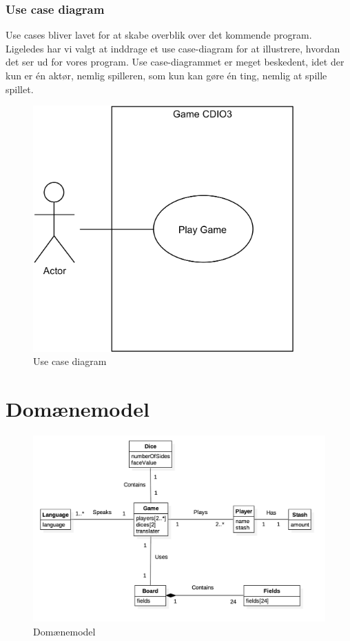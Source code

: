 \subsubsection{Use case diagram}
Use cases bliver lavet for at skabe overblik over det kommende program.
Ligeledes har vi valgt at inddrage et use case-diagram for at illustrere, hvordan det ser ud for vores program.
Use case-diagrammet er meget beskedent, idet der kun er én aktør, nemlig spilleren, som kun kan gøre én ting, nemlig at spille spillet.
\begin{figure}[H]
    \begin{center}
        \includegraphics[width=10cm]{graphics/usecases/UseCase1.png}
        \caption{Use case diagram}
        \label{fig:use_case_diagram}
    \end{center}
\end{figure}

\pagebreak

\section{Domænemodel}

\begin{figure}[H]
    \begin{center}
        \includegraphics[width=\columnwidth]{graphics/domain/Domainmodel.png}
        \caption{Domænemodel}
        \label{fig:use_case_diagram}
    \end{center}
\end{figure}